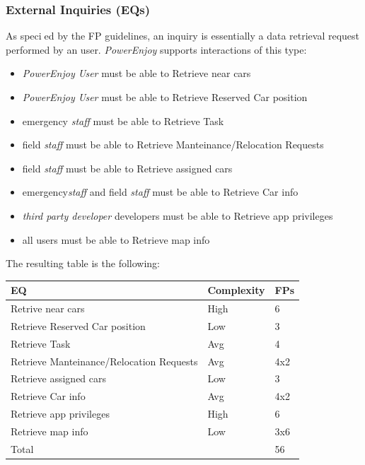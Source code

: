\documentclass[english]{article}
\newenvironment{fpcounttable}[1]{
	\begin{center}
	\begin{longtable}{|l|l|l|}
	\hline 
	#1 & Complexity & FPs \\\hline
}{
	\end{longtable}\end{center}
}
\newcommand{\fptotal}[1]{
	\multicolumn{2}{|l|}{{Total}}
	& #1\\\hline
}
\newcommand{\powerenjoy}{\textit{PowerEnjoy }}
\newcommand{\powerenjoyuser}{\textit{PowerEnjoy User }}
\newcommand{\staff}{\textit{staff }}
\newcommand{\thirdparty}{\textit{third party developer }}
\newcommand{\eih}{ & High & 6}
\newcommand{\eia}{ &Avg & 4}
\newcommand{\eil}{ & Low & 3}
\begin{document}
\subsubsection{External Inquiries (EQs)}
As specied by the FP guidelines, an inquiry is essentially a data retrieval request performed by an user.
\powerenjoy supports interactions of this type:
\begin{itemize} 
	\item \powerenjoyuser must be able to Retrieve near cars
	\item \powerenjoyuser must be able to Retrieve Reserved Car position
	\item emergency \staff must be able to Retrieve Task
	\item field \staff must be able to Retrieve Manteinance/Relocation Requests 
	\item field \staff must be able to Retrieve assigned cars 
	\item emergency\staff and field \staff must be able to Retrieve Car info
	\item \thirdparty developers must be able to Retrieve app privileges
	\item all users must be able to Retrieve map info 
\end{itemize}
The resulting table is the following:
\begin{fpcounttable}{EQ}
Retrive near cars \eih \\
Retrieve Reserved Car position \eil \\
Retrieve Task \eia \\
Retrieve Manteinance/Relocation Requests  \eia x2\\
Retrieve assigned cars \eil\\
Retrieve Car info \eia x2\\
Retrieve app privileges\eih \\
Retrieve map info \eil x6\\ \hline 
\fptotal{56}	
\end{fpcounttable}
\end{document}
